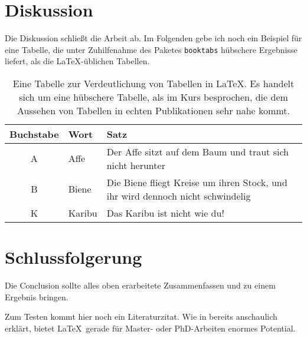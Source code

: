 
\chapter{Diskussion}
\label{ch:diskussion}

Die Diskussion schließt die Arbeit ab. Im Folgenden gebe ich noch ein Beispiel für eine Tabelle, die unter Zuhilfenahme des Paketes \texttt{booktabs} hübschere Ergebnisse liefert, als die \LaTeX-üblichen Tabellen.


\begin{table}[ht]
\centering
\caption[Kurzname Tabelle]{Eine Tabelle zur Verdeutlichung von Tabellen in \LaTeX. Es handelt sich um eine hübschere Tabelle, als im Kurs besprochen, die dem Aussehen von Tabellen in echten Publikationen sehr nahe kommt.}
\begin{tabular}{clp{6cm}}
\addlinespace					%
\toprule						%
Buchstabe   &	Wort	&	Satz			\\
\midrule						%
A			&	Affe	&	Der Affe sitzt auf dem Baum und traut sich nicht herunter	\\
B			&	Biene	&	Die Biene fliegt Kreise um ihren Stock, und ihr wird dennoch nicht schwindelig \\
K			&	Karibu	&	Das Karibu ist nicht wie du! \\
\bottomrule						%
\end{tabular}
\label{tab:Buchstaben}		    %
\end{table}


\chapter{Schlussfolgerung}
\label{ch:schlussfolgerung}

Die Conclusion sollte alles oben erarbeitete Zusammenfassen und zu einem Ergebnis bringen.

Zum Testen kommt hier noch ein Literaturzitat. Wie in \cite{Dockner2010} bereits anschaulich erklärt, bietet \LaTeX\ gerade für Master- oder PhD-Arbeiten enormes Potential.